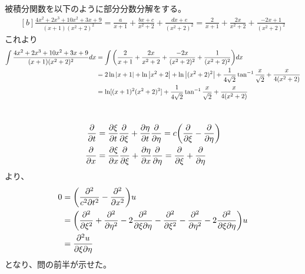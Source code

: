 \documentclass[../ap_2011.tex]{subfiles}
\begin{document}
\subsection{}
被積分関数を以下のように部分分数分解をする。
\begin{equation}\begin{aligned}[b]
    \frac{4x^2+2x^3+10x^2+3x+9}{(x+1)(x^2+2)^2}
    =\frac{a}{x+1}+\frac{bx+c}{x^2+2}+\frac{dx+e}{(x^2+2)^2}
    =\frac{2}{x+1}+\frac{2x}{x^2+2}+\frac{-2x+1}{(x^2+2)^2}
\end{aligned}\end{equation}
これより
\begin{equation}\begin{aligned}[b]
    \int\frac{4x^2+2x^3+10x^2+3x+9}{(x+1)(x^2+2)^2}dx
    &=\int\qty(\frac{2}{x+1}+\frac{2x}{x^2+2}+\frac{-2x}{(x^2+2)^2}+\frac{1}{(x^2+2)^2})dx\\
    &=2\ln\abs{x+1}+\ln\abs{x^2+2}+\ln\abs{(x^2+2)^2}+\frac{1}{4\sqrt{2}}\tan^{-1}\frac{x}{\sqrt{2}}+\frac{x}{4(x^2+2)}\\
    &=\ln[(x+1)^2(x^2+2)^3]+\frac{1}{4\sqrt{2}}\tan^{-1}\frac{x}{\sqrt{2}}+\frac{x}{4(x^2+2)}
\end{aligned}\end{equation}

\section{}
\subsection{}
\begin{equation}\begin{aligned}[b]
    \pdv{t}&=\pdv{\xi}{t}\pdv{\xi}+\pdv{\eta}{t}\pdv{\eta}=c\qty(\pdv{\xi}-\pdv{\eta})\\
    \pdv{x}&=\pdv{\xi}{x}\pdv{\xi}+\pdv{\eta}{x}\pdv{\eta}=\pdv{\xi}+\pdv{\eta}
\end{aligned}\end{equation}
より、
\begin{equation}\begin{aligned}[b]
    0&=\qty(\frac{\partial^2}{c^2\partial t^2}-\pdv[2]{x})u\\
    &=\qty(\pdv[2]{\xi}+\pdv[2]{\eta}-2\frac{\partial^2}{\partial\xi\partial\eta}
    -\pdv[2]{\xi}-\pdv[2]{\eta}-2\frac{\partial^2}{\partial\xi\partial\eta})u\\
    &=\pdv[2]{u}{\xi}{\eta}
\end{aligned}\end{equation}
となり、問の前半が示せた。
\end{document}
